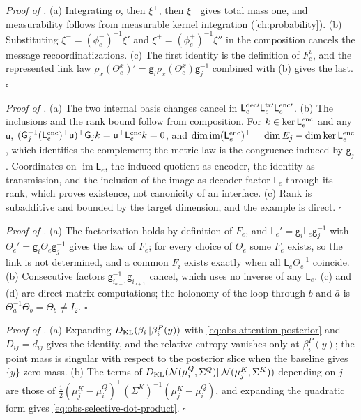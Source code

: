 \noindent\emph{Proof of .}
(a) Integrating \(o\), then \(\xi^+\), then \(\xi^-\) gives total mass one, and
measurability follows from measurable kernel integration
(\cref{ch:probability}). (b) Substituting \(\xi^-=(\phi_e^-)^{-1}\xi'\) and
\(\xi^+=(\phi_e^+)^{-1}\xi''\) in the composition cancels the message
recoordinatizations. (c) The first identity is the definition of \(F_e^v\), and
the represented link law \(\rho_x(\Theta^x_e)'=\mathsf g_i\rho_x(\Theta^x_e)
\mathsf g_j^{-1}\) combined with (b) gives the last. \(\square\)

\noindent\emph{Proof of .}
(a) The two internal basis changes cancel in
\(\mathsf L^{\rm dec\prime}_e\mathsf L^{\rm tr\prime}_e\mathsf L^{\rm enc\prime}_e\).
(b) The inclusions and the rank bound follow from composition. For
\(k\in\ker\mathsf L^{\rm enc}_e\) and any \(\mathsf u\),
\((\mathsf G_j^{-1}(\mathsf L^{\rm enc}_e)^\top\mathsf u)^\top\mathsf G_jk
=\mathsf u^\top\mathsf L^{\rm enc}_ek=0\), and
\(\dim\operatorname{im}(\mathsf L^{\rm enc}_e)^\top=\dim E_j-\dim\ker
\mathsf L^{\rm enc}_e\), which identifies the complement; the metric law is the
congruence induced by \(\mathsf g_j\). Coordinates on
\(\operatorname{im}\mathsf L_e\), the induced quotient as encoder, the identity
as transmission, and the inclusion of the image as decoder factor
\(\mathsf L_e\) through its rank, which proves existence, not canonicity of an
interface. (c) Rank is subadditive and bounded by the target dimension, and
the example is direct. \(\square\)

\noindent\emph{Proof of .}
(a) The factorization holds by definition of \(F_e\), and
\(\mathsf L_e'=\mathsf g_i\mathsf L_e\mathsf g_j^{-1}\) with
\(\Theta_e'=\mathsf g_i\Theta_e\mathsf g_j^{-1}\) gives the law of \(F_e\); for
every choice of \(\Theta_e\) some \(F_e\) exists, so the link is not
determined, and a common \(F_i\) exists exactly when all
\(\mathsf L_e\Theta_e^{-1}\) coincide. (b) Consecutive factors
\(\mathsf g_{i_{a+1}}^{-1}\mathsf g_{i_{a+1}}\) cancel, which uses no inverse of
any \(\mathsf L_e\). (c) and (d) are direct matrix computations; the holonomy
of the loop through \(b\) and \(\bar a\) is
\(\Theta_a^{-1}\Theta_b=\Theta_b\ne I_2\). \(\square\)

\noindent\emph{Proof of .}
(a) Expanding \(D_{\mathrm{KL}}(\beta_i\Vert\beta_i^P(y))\) with
\eqref{eq:obs-attention-posterior} and \(D_{ij}=d_{ij}\) gives the identity,
and the relative entropy vanishes only at \(\beta_i^P(y)\); the point mass is
singular with respect to the posterior slice when the baseline gives \(\{y\}\)
zero mass. (b) The terms of
\(D_{\mathrm{KL}}(\mathcal N(\mu^Q_i,\Sigma^Q)\Vert\mathcal N(\mu^K_j,\Sigma^K))\) depending
on \(j\) are those of
\(\frac12(\mu^K_j-\mu^Q_i)^\top(\Sigma^K)^{-1}(\mu^K_j-\mu^Q_i)\), and expanding
the quadratic form gives \eqref{eq:obs-selective-dot-product}. \(\square\)

